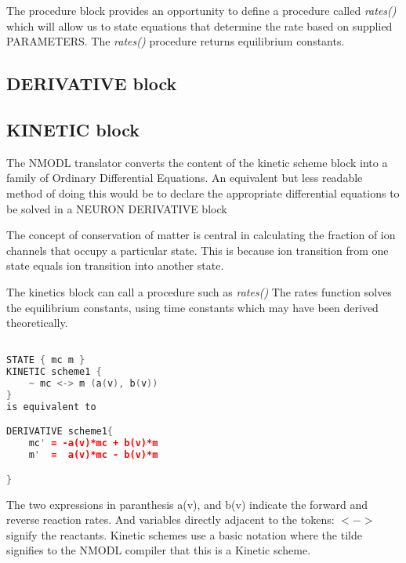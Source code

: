 \documentclass[draftspec]{ninemlspec}
\begin{document}

The procedure block provides an opportunity to define a procedure called { \it rates()}  which will allow us to state equations that determine the rate based on supplied PARAMETERS. The { \it rates()} procedure returns equilibrium constants.


\subsection{DERIVATIVE block}


\subsection{KINETIC block}

The NMODL translator converts the content of the kinetic scheme block into a family of Ordinary Differential Equations. An equivalent but less readable method of doing this would be to declare the appropriate differential equations to be solved in a NEURON DERIVATIVE block\cite{carnevale2006neuron}

The concept of conservation of matter is central in calculating the fraction of ion channels that occupy a particular state. This is because ion transition from one state equals ion transition into another state.

The kinetics block can call a procedure such as { \it rates()}
The rates function solves the equilibrium constants, using time constants which may have been derived theoretically.




\begin{lstlisting}[language=c]

STATE { mc m }
KINETIC scheme1 {
	~ mc <-> m (a(v), b(v))
}
is equivalent to 

DERIVATIVE scheme1{
	mc' = -a(v)*mc + b(v)*m
	m'  =  a(v)*mc - b(v)*m

}

\end{lstlisting}
The two expressions in paranthesis a(v), and b(v) indicate the forward and reverse reaction rates. And variables directly adjacent to the tokens: $<->$ signify the reactants. Kinetic schemes use a basic notation where the tilde ~ signifies to the NMODL compiler that this is a Kinetic scheme. 
\end{document}
